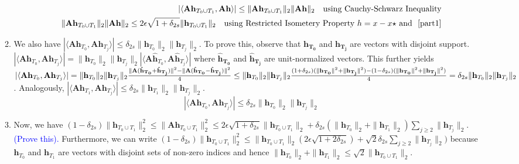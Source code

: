 \documentclass[11pt]{article}
\begin{document}
\begin{enumerate}
\begin{enumerate}
\begin{eqnarray}\label{part4b}
|\langle \mathbf{Ah}_{T_0 \cup T_1} , \mathbf{Ah}\rangle| \leq \|\mathbf{Ah}_{T_0 \cup T_1}\|_2 \|\mathbf{Ah}\|_2 \quad \text{using Cauchy-Schwarz Inequality}\\
\|\mathbf{Ah}_{T_0 \cup T_1}\|_2 \|\mathbf{Ah}\|_2 \leq 2 \epsilon \sqrt{1 + \delta_{2s}} \|\mathbf{h}_{T_0 \cup T_1}\|_2 \quad \text{using Restricted Isometery Property $h = x-x\star$ and ~\ref{part1}}
\end{eqnarray}
\item We also have $|\langle \mathbf{Ah}_{T_0}, \mathbf{Ah}_{T_j}\rangle| \leq \delta_{2s} \|\mathbf{h}_{T_0}\|_2 \|\mathbf{h}_{T_j}\|_2$. To prove this, observe that $\mathbf{h_{T_0}}$ and $\mathbf{h_{T_j}}$ are vectors with disjoint support. $|\langle \mathbf{Ah}_{T_0}, \mathbf{Ah}_{T_j}\rangle| = \|\mathbf{h}_{T_0}\|_2 \|\mathbf{h}_{T_j}\|_2|\langle \mathbf{A\hat{h}}_{T_0}, \mathbf{A\hat{h}}_{T_j}\rangle|$  where $\mathbf{\hat{h}_{T_0}}$ and $\mathbf{\hat{h}_{T_j}}$ are unit-normalized vectors. This further yields $|\langle \mathbf{Ah}_{T_0}, \mathbf{Ah}_{T_j}\rangle|=\|\mathbf{h}_{T_0}\|_2 \|\mathbf{h}_{T_j}\|_2 \frac{\|\mathbf{A}(\mathbf{\hat{h}_{T_0}}+\mathbf{\hat{h}_{T_j}})\|^2 - \|\mathbf{A}(\mathbf{\hat{h}_{T_0}}-\mathbf{\hat{h}_{T_j}})\|^2}{4} 
\\ \leq \|\mathbf{h}_{T_0}\|_2 \|\mathbf{h}_{T_j}\|_2 \frac{(1+\delta_{2s})(\|\mathbf{h_{T_0}}\|^2+\|\mathbf{h_{T_j}}\|^2)-(1-\delta_{2s})(\|\mathbf{h_{T_0}}\|^2+\|\mathbf{h_{T_j}}\|^2)}{4} \\
= \delta_{2s} \|\mathbf{h}_{T_0}\|_2 \|\mathbf{h}_{T_j}\|_2$. Analogously, $|\langle \mathbf{Ah}_{T_1}, \mathbf{Ah}_{T_j}\rangle| \leq \delta_{2s} \|\mathbf{h}_{T_1}\|_2 \|\mathbf{h}_{T_j}\|_2$. 
\begin{equation}\label{part4c}
|\langle \mathbf{Ah}_{T_0}, \mathbf{Ah}_{T_j}\rangle| \leq \delta_{2s} \|\mathbf{h}_{T_0}\|_2 \|\mathbf{h}_{T_j}\|_2
\end{equation}
\item Now, we have $(1-\delta_{2s})\|\mathbf{h}_{T_0 \cup T_1}\|^2_2 
\leq \|\mathbf{Ah}_{T_0 \cup T_1}\|^2_2 \leq 2 \epsilon \sqrt{1+\delta_{2s}}\|\mathbf{h}_{T_0 \cup T_1}\|_2 + \delta_{2s}(\|\mathbf{h}_{T_0}\|_2 + \|\mathbf{h}_{T_1}\|_2) \sum_{j \geq 2} \|\mathbf{h}_{T_j}\|_2$. \textcolor{blue}{(Prove this).} Furthermore, we can write $(1-\delta_{2s})\|\mathbf{h}_{T_0 \cup T_1}\|^2_2  \leq \|\mathbf{h}_{T_0 \cup T_1}\|_2(2\epsilon\sqrt{1+2\delta_{2s}}) + \sqrt{2}\delta_{2s} \sum_{j \geq 2} \|\mathbf{h}_{T_j}\|_2)$ because $\mathbf{h}_{T_0}$ and $\mathbf{h}_{T_1}$ are vectors with disjoint sets of non-zero indices and hence $\|\mathbf{h}_{T_0}\|_2 + \|\mathbf{h}_{T_1}\|_2 \leq \sqrt{2} \|\mathbf{h}_{T_0 \cup T_1}\|_2$.

\end{enumerate}
\end{enumerate}
\end{document}
